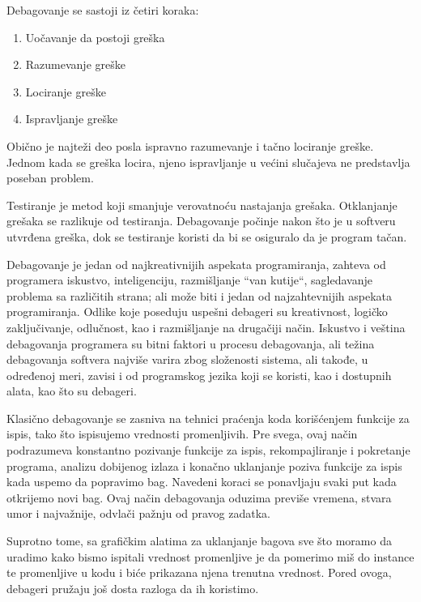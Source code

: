 \documentclass[a4paper]{article}
\begin{document}
\vspace{4mm}
Debagovanje se sastoji iz četiri koraka:
\begin{enumerate}
\item Uočavanje da postoji greška
\item Razumevanje greške
\item Lociranje greške
\item Ispravljanje greške
\end{enumerate}

\vspace{4mm}

Obično je najteži deo posla ispravno razumevanje i tačno lociranje greške. Jednom kada 
se greška locira, njeno ispravljanje u većini slučajeva ne predstavlja poseban problem.

Testiranje je metod koji smanjuje verovatnoću nastajanja grešaka.
Otklanjanje grešaka se razlikuje od testiranja. Debagovanje počinje
nakon što je u softveru utvrđena greška, dok se testiranje koristi da bi
se osiguralo da je program tačan.

Debagovanje je jedan od najkreativnijih aspekata programiranja, zahteva od programera iskustvo,
inteligenciju, razmišljanje ``van kutije``, sagledavanje problema sa različitih strana;  
ali može biti i jedan od najzahtevnijih aspekata programiranja. Odlike koje poseduju uspešni debageri su 
kreativnost, logičko zaključivanje, odlučnost, kao i razmišljanje na drugačiji način.
Iskustvo i veština debagovanja programera su bitni faktori u procesu debagovanja, ali težina 
debagovanja softvera najviše varira zbog složenosti sistema, ali takođe, u određenoj meri,
zavisi i od programskog jezika koji se koristi, kao i dostupnih alata, kao što su 
debageri. 

Klasično debagovanje se zasniva na tehnici praćenja koda korišćenjem funkcije za ispis, tako što 
ispisujemo vrednosti promenljivih. Pre svega, ovaj način podrazumeva konstantno pozivanje funkcije za 
ispis, rekompajliranje i pokretanje programa, analizu dobijenog izlaza i konačno uklanjanje 
poziva funkcije za ispis kada uspemo da popravimo bag. Navedeni koraci se ponavljaju svaki put 
kada otkrijemo novi bag. Ovaj način debagovanja oduzima previše vremena, stvara umor i najvažnije,
odvlači pažnju od pravog zadatka.

Suprotno tome, sa grafičkim alatima za uklanjanje bagova sve što moramo da uradimo kako bismo 
ispitali vrednost promenljive je da pomerimo miš do instance te promenljive u kodu i biće
prikazana njena trenutna vrednost. Pored ovoga, debageri pružaju još dosta razloga da ih koristimo\cite{art_debugging}.
\end{document}
